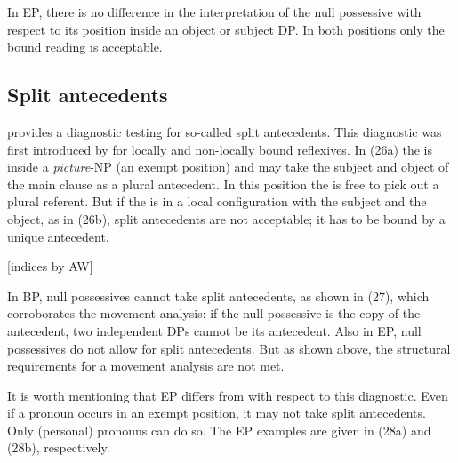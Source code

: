 \documentclass[output=paper]{langsci/langscibook}
\begin{document}
In EP, there is no difference in the interpretation of the null possessive with respect to its position inside an object or subject DP. In both positions only the bound reading is acceptable.

\subsection{Split antecedents}%

\citet{Rodrigues2010} provides a diagnostic testing for so-called split antecedents. This diagnostic was first introduced by \citet{Lebeaux1985} for locally and non-locally bound reflexives. In (26a) the  is inside a \textit{picture}{}-NP (an exempt position) and may take the subject and object of the main clause as a plural antecedent. In this position the  is free to pick out a plural referent. But if the  is in a local configuration with the subject and the object, as in (26b), split antecedents are not acceptable; it has to be bound by a unique antecedent.

\ea%
    \citep[346]{Lebeaux1985} [indices by AW]  \label{ex:wein:26}\\
    \z
\z

In BP, null possessives cannot take split antecedents, as shown in (27), which corroborates the movement analysis: if the null possessive is the copy of the antecedent, two independent DPs cannot be its antecedent. Also in EP, null possessives do not allow for split antecedents. But as shown above, the structural requirements for a movement analysis are not met.

    \z

It is worth mentioning that EP differs from  with respect to this diagnostic. Even if a  pronoun occurs in an exempt position, it may not take split antecedents. Only (personal) pronouns can do so. The EP examples are given in (28a) and (28b), respectively.
\end{document}
